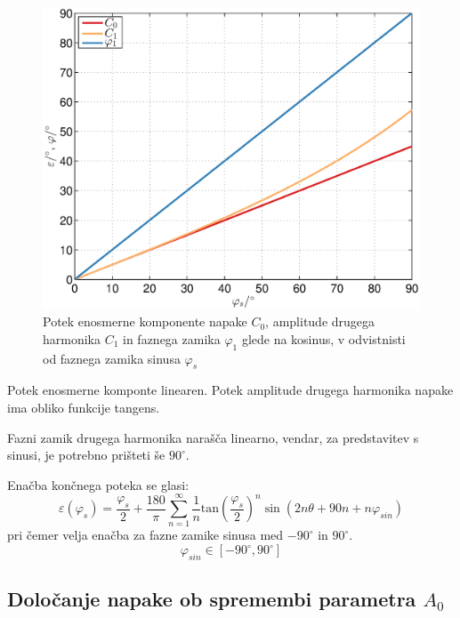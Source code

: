 \documentclass[a4paper]{article}
\begin{document}
\begin{figure}[!htb]
	\begin{center}
		\includegraphics[width=\linewidth]{./Slike/fis.eps}
		\caption{Potek enosmerne komponente napake $C_0$, amplitude drugega harmonika $C_1$ in faznega zamika $\varphi_1$ glede na kosinus, v odvistnisti od faznega zamika sinusa $\varphi_{s}$} \label{fig:fis}
	\end{center}
\end{figure}

Potek enosmerne komponte linearen.
Potek amplitude drugega harmonika napake ima obliko funkcije tangens.

Fazni zamik drugega harmonika narašča linearno, vendar, za predstavitev s sinusi, je potrebno prišteti še $90^\circ$.

Enačba končnega poteka se glasi:
\begin{equation}
\label{equ:fis_err}
\varepsilon(\varphi_{s}) = \frac{\varphi_{s}}{2}+ \frac{180}{\pi}\sum_{n=1}^{\infty}\frac{1}{n} \mathrm{tan}(\frac{\varphi_{s}}{2})^n \sin (2n \theta+90 n +n \varphi_{sin})
\end{equation}
pri čemer velja enačba za fazne zamike sinusa med $-90^\circ$ in $90^\circ$.
$$ \varphi_{sin} \in [ -90^\circ , 90^\circ ] $$

\subsection{Določanje napake ob spremembi parametra $A_0$}
\end{document}
